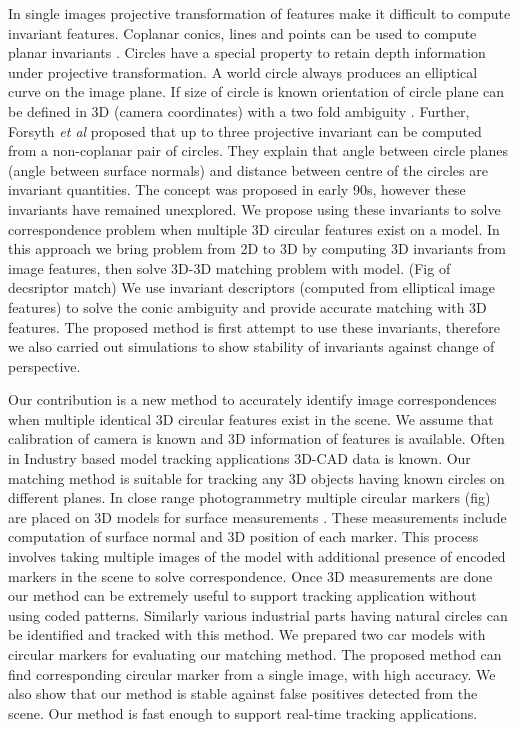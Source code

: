 \documentclass{bmvc2k}
\def\etal{\emph{et al}\bmvaOneDot}
\begin{document}
In single images projective transformation of features make it difficult to compute invariant features. Coplanar conics, lines and points can be used to compute planar invariants \cite{forsyth_91}. Circles have a special property to retain depth information under projective transformation. A world circle always produces an elliptical curve on the image plane. If size of circle is known orientation of circle plane can be defined in 3D (camera coordinates) with a two fold ambiguity \cite{forsyth_91} \cite{safaee-rad_three-dimensional_1992}. 
Further, Forsyth \etal \cite{forsyth_91} proposed that up to three projective invariant can be computed from a non-coplanar pair of circles. They explain that angle between circle planes (angle between surface normals) and distance between centre of the circles are invariant quantities. The concept was proposed in early 90s, however these invariants have remained unexplored. 
We propose using these invariants to solve correspondence problem when multiple 3D circular features exist on a model. 
In this approach we bring problem from 2D to 3D by computing 3D invariants from image features, then solve 3D-3D matching problem with model. (Fig of decsriptor match) 
We use invariant descriptors (computed from elliptical image features) to solve the conic ambiguity and provide accurate matching with 3D features. 
The proposed method is first attempt to use these invariants, therefore we also carried out simulations to show stability of invariants against change of perspective.  

Our contribution is a new method to accurately identify image correspondences when multiple identical 3D circular features exist in the scene. We assume that calibration of camera is known and 3D information of features is available. 
Often in Industry based model tracking applications 3D-CAD data is known. Our matching method is suitable for tracking any 3D objects having known circles on different planes. In close range photogrammetry multiple circular markers (fig) are placed on 3D models for surface measurements \cite{luhmann_close_2006}. 
These measurements include computation of surface normal and 3D position of each marker. 
This process involves taking multiple images of the model with additional presence of encoded markers in the scene to solve correspondence. 
Once 3D measurements are done our method can be extremely useful to support tracking application without using coded patterns. Similarly various industrial parts having natural circles can be identified and tracked with this method. 
We prepared two car models with circular markers for evaluating our matching method. The proposed method can find corresponding circular marker from a single image, with high accuracy. We also show that our method is stable against false positives detected from the scene. Our method is fast enough to support real-time tracking applications. 
\end{document}
